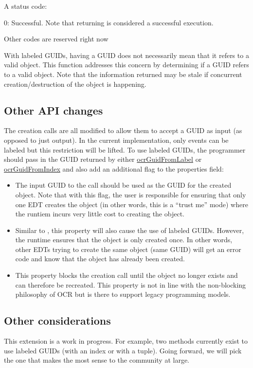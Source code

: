 \returns
A status code:
\begin{DoxyItemize}
\item 0: Successful. Note that returning  is
  considered a successful execution.
\item Other codes are reserved right now
\end{DoxyItemize}

\descr
With labeled GUIDs, having a GUID does not necessarily mean that it
refers to a valid object. This function addresses this concern by
determining if a GUID refers to a valid object. Note that the
information returned may be stale if concurrent creation/destruction
of the object is happening.
\subsection{Other API changes}
The creation calls are all modified to allow them to accept a GUID as
input (as opposed to just output). In the current implementation, only
events can be labeled but this restriction will be lifted. To use
labeled GUIDs, the programmer should pass in the GUID returned by
either \hyperlink{func_ocrGuidFromLabel}{ocrGuidFromLabel} or
\hyperlink{func_ocrGuidFromIndex}{ocrGuidFromIndex} and also add an
additional flag to the properties field:
\begin{itemize}
\item {} The input GUID to the call should
  be used as the GUID for the created object. Note that with this
  flag, the user is responsible for ensuring that only one EDT creates
  the object (in other words, this is a ``trust me'' mode) where the
  runtiem incurs very little cost to creating the object.
\item {} Similar to
  , this property will also cause the
  use of labeled GUIDs. However, the runtime ensures that the object
  is only created once. In other words, other EDTs trying to create
  the same object (same GUID) will get an error code and know that the
  object has already been created.
\item {} This property blocks the creation call
  until the object no longer exists and can therefore be
  recreated. This property is not in line with the non-blocking
  philosophy of OCR but is there to support legacy programming models.
\end{itemize}
\subsection{Other considerations}
This extension is a work in progress. For example, two methods
currently exist to use labeled GUIDs (with an index or with a
tuple). Going forward, we will pick the one that makes the most sense
to the community at large.

